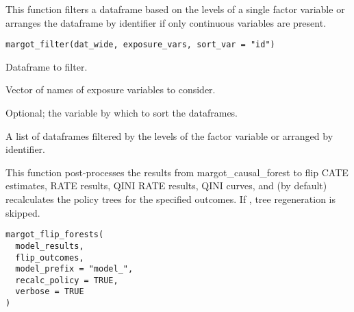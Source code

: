 \documentclass[a4paper]{book}
\begin{document}
%
\begin{Description}
This function filters a dataframe based on the levels of a single factor variable or arranges
the dataframe by identifier if only continuous variables are present.
\end{Description}
%
\begin{Usage}
\begin{verbatim}
margot_filter(dat_wide, exposure_vars, sort_var = "id")
\end{verbatim}
\end{Usage}
%
\begin{Arguments}
\begin{ldescription}
\item[\code{dat\_wide}] Dataframe to filter.

\item[\code{exposure\_vars}] Vector of names of exposure variables to consider.

\item[\code{sort\_var}] Optional; the variable by which to sort the dataframes.
\end{ldescription}
\end{Arguments}
%
\begin{Value}
A list of dataframes filtered by the levels of the factor variable or arranged by identifier.
\end{Value}
%
\begin{Description}
This function post-processes the results from margot\_causal\_forest to flip CATE estimates,
RATE results, QINI RATE results, QINI curves, and (by default) recalculates the policy trees
for the specified outcomes. If , tree regeneration is skipped.
\end{Description}
%
\begin{Usage}
\begin{verbatim}
margot_flip_forests(
  model_results,
  flip_outcomes,
  model_prefix = "model_",
  recalc_policy = TRUE,
  verbose = TRUE
)
\end{verbatim}
\end{Usage}
%
\end{document}
